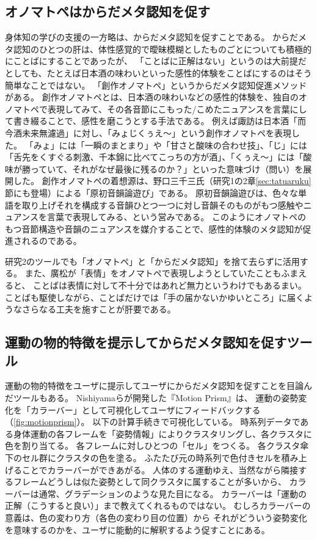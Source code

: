 \subsection{オノマトペはからだメタ認知を促す}
身体知の学びの支援の一方略は、からだメタ認知を促すことである。
からだメタ認知のひとつの肝は、体性感覚的で曖昧模糊としたものごとについても積極的にことばにすることであったが、
「ことばに正解はない」というのは大前提だとしても、たとえば日本酒の味わいといった感性的体験をことばにするのはそう簡単なことではない。
「創作オノマトペ」\cite{otsuka:2015}というからだメタ認知促進メソッドがある。
創作オノマトペとは、日本酒の味わいなどの感性的体験を、独自のオノマトペで表現してみて、その各音節にこもった/こめたニュアンスを言葉にして書き綴ることで、感性を磨こうとする手法である。
例えば諏訪は日本酒「而今酒未来無濾過」に対し、「みょじくぅえ〜」という創作オノマトペを表現した。
「みょ」には「一瞬のまとまり」や「甘さと酸味の合わせ技」、「じ」には「舌先をくすぐる刺激、千本錦に比べてこっちの方が酒」、「くぅえ〜」には「酸味が勝っていて、それがなぜ最後に残るのか？」といった意味づけ（問い）を展開した。
創作オノマトペの着想源は、野口三千三氏（研究1の2章\autoref{sec:tatuaruku}節にも登場）による「原初音韻論遊び\cite{noguchi:2003}」である。
原初音韻論遊びは、色々な単語を取り上げそれを構成する音韻ひとつ一つに対し音韻そのものがもつ感触やニュアンスを言葉で表現してみる、という営みである。
このようにオノマトペのもつ音節構造や音韻のニュアンスを媒介することで、感性的体験のメタ認知が促進されるのである。

研究2のツールでも「オノマトペ」と「からだメタ認知」を捨て去らずに活用する。
また、廣松が「表情」をオノマトペで表現しようとしていた\cite{hiromatsu:1989}こともふまえると、
ことばは表情に対して不十分ではあれど無力というわけでもあるまい。
ことばも駆使しながら、ことばだけでは「手の届かないかゆいところ」に届くようなさらなる工夫を施すことが肝要である。

\subsection{運動の物的特徴を提示してからだメタ認知を促すツール}
運動の物的特徴をユーザに提示してユーザにからだメタ認知を促すことを目論んだツールもある。
Nishiyamaら\cite{nishiyama:2010}が開発した『Motion Prism』は、
運動の姿勢変化を「カラーバー」として可視化してユーザにフィードバックする（\autoref{fig:motionprism}）。
以下の計算手続きで可視化している。
時系列データである身体運動の各フレームを「姿勢情報」によりクラスタリングし、各クラスタに色を割り当てる。
各フレームに対しひとつの「セル」をつくる。
各クラスタ傘下のセル群にクラスタの色を塗る。
ふたたび元の時系列で色付きセルを積み上げることでカラーバーができあがる。
人体のする運動ゆえ、当然ながら隣接するフレームどうしは似た姿勢として同クラスタに属することが多いから、
カラーバーは通常、グラデーションのような見た目になる。
カラーバーは「運動の正解（こうすると良い）」まで教えてくれるものではない。
むしろカラーバーの意義は、色の変わり方（各色の変わり目の位置）から
それがどういう姿勢変化を意味するのかを、ユーザに能動的に解釈するよう促すことにある。

